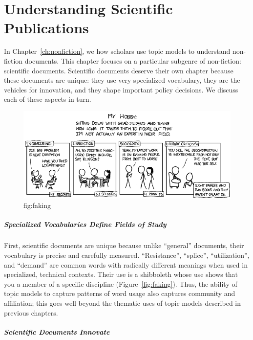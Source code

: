 

\chapter{Understanding Scientific Publications}
\label{ch:sci}

In Chapter~\ref{ch:nonfiction}, we how scholars use topic models to understand
non-fiction documents.  This chapter focuses on a particular subgenre of
non-fiction: scientific documents.  Scientific documents deserve their own
chapter because these documents are unique: they use very specialized
vocabulary, they are the vehicles for innovation, and they shape important
policy decisions.  We discuss each of these aspects in turn.

\begin{figure}
\includegraphics[width=\linewidth]{figures/sci_faking}
\caption{fig:faking}
\end{figure}

\paragraph{Specialized Vocabularies Define Fields of Study}

First, scientific documents are unique because unlike ``general'' documents,
their vocabulary is precise and carefully measured.  ``Resistance'', ``splice'',
``utilization'', and ``demand'' are common words with radically different
meanings when used in specialized, technical contexts.  Their use is a
shibboleth whose use shows that you a member of a specific discipline
(Figure~\ref{fig:faking}).  Thus, the ability of topic models to capture
patterns of word usage also captures community and affiliation; this goes well
beyond the thematic uses of topic models described in previous chapters.

\paragraph{Scientific Documents Innovate}

